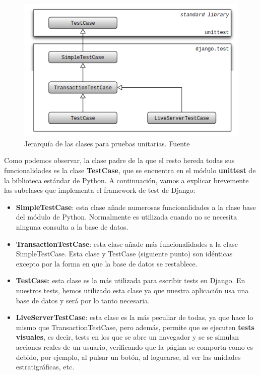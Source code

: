     \begin{figure}[H]
        \centering
        \includegraphics[scale=0.60]{imagenes/classes-hierarchy.png}
        \caption[Jerarquía de las clases para pruebas unitarias.]{Jerarquía de las
        clases para pruebas unitarias. Fuente \cite{classes-hierarchy}}
        \label{fig:classes-hierarchy}
    \end{figure}

Como podemos observar, la clase padre de la que el resto hereda todas sus funcionalidades
es la clase \textbf{TestCase}, que se encuentra en el módulo \textbf{unittest} de la
biblioteca estándar de Python. A continuación, vamos a explicar brevemente las subclases
que implementa el framework de test de Django:

    \begin{itemize}
        \item \textbf{SimpleTestCase}: esta clase añade numerosas funcionalidades a la
        clase base del módulo de Python. Normalmente es utilizada cuando no se necesita
        ninguna consulta a la base de datos.
        \item \textbf{TransactionTestCase}: esta clase añade más funcionalidades a la
        clase SimpleTestCase. Esta clase y TestCase (siguiente punto) son idénticas
        excepto por la forma en que la base de datos se restablece.
        \item \textbf{TestCase}: esta clase es la más utilizada para escribir tests en
        Django. En nuestros tests, hemos utilizado esta clase ya que nuestra aplicación
        usa una base de datos y será por lo tanto necesaria.
        \item \textbf{LiveServerTestCase}: esta clase es la más peculiar de todas, ya que
        hace lo mismo que TransactionTestCase, pero además, permite que se ejecuten
        \textbf{tests visuales}, es decir, tests en los que se abre un navegador y se
        se simulan acciones reales de un usuario, verificando que la página se comporta
        como es debido, por ejemplo, al pulsar un botón, al loguearse, al ver las unidades
        estratigráficas, etc.
    \end{itemize}

